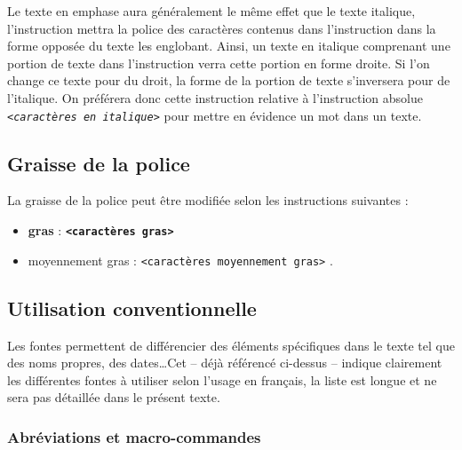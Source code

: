 \documentclass[a4paper, 11pt, twoside, fleqn]{memoir}
\begin{document}
Le texte en emphase aura généralement le même effet que le texte italique, l'instruction \texttt{\emph{}} mettra la police des caractères contenus dans l'instruction dans la forme opposée du texte les englobant. Ainsi, un texte en italique comprenant une portion de texte dans l'instruction \texttt{\emph{}} verra cette portion en forme droite. Si l'on change ce texte pour du droit, la forme de la portion de texte s'inversera pour de l'italique. On préférera donc cette instruction relative à l'instruction absolue \texttt{\textit{<caractères en italique>}} pour mettre en évidence un mot dans un texte.\\

	\subsection{Graisse de la police}
	
	La graisse de la police peut être modifiée selon les instructions suivantes :
	
			\begin{itemize}
	\item \textbf{gras} : \texttt{\textbf{<caractères gras>}} 
	\item \textmd{moyennement gras} : \texttt{\textmd{<caractères moyennement gras>}} .
		\end{itemize}	
		
	\subsection{Utilisation conventionnelle}

Les fontes permettent de différencier des éléments spécifiques dans le texte tel que des noms propres, des dates\ldots Cet  -- déjà référencé ci-dessus -- indique clairement les différentes fontes à utiliser selon l'usage en français, la liste est longue et ne sera pas détaillée dans le présent texte.\\
	
	\subsubsection{Abréviations et macro-commandes\label{subsubsec:abreviations_macro-commandes}}
\end{document}
